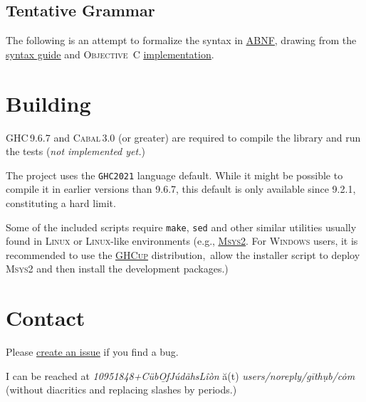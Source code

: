 \documentclass[11pt]{article}
\newcommand{\link}[2]{\underline{\color{darkblue}\href{#1}{#2}}}
\begin{document}
  \subsection*{Tentative Grammar}
    The following is an attempt to formalize the syntax in
    \link{https://datatracker.ietf.org/doc/html/rfc5234}{\textsc{ABNF}},
    drawing from the \link{https://fountain.io/syntax/}{syntax guide} and
    \textsc{Objective~C}
    \link{https://github.com/nyousefi/Fountain}{implementation}.

    

\section*{Building}
\textsc{GHC}\,9.6.7 and \textsc{Cabal}\,3.0 (or greater) are required to
compile the library and run the tests ({\em not implemented yet.})

The project uses the \texttt{GHC2021} language default. While it might
be possible to compile it in earlier versions than 9.6.7, this default
is only available since 9.2.1, constituting a hard limit.

Some of the included scripts require \texttt{make}, \texttt{sed} and
other similar utilities usually found in \textsc{Linux} or
\textsc{Linux}-like environments (e.g.,
\link{https://www.msys2.org/}{\textsc{Msys2}}\@. For \textsc{Windows}
users, it is recommended to use the
\link{https://www.haskell.org/ghcup/}{\textsc{GHCup}} distribution,\
allow the installer script to deploy \textsc{Msys2} and then install
the development packages.)

\section*{Contact}
Please
\link{https://github.com/CubOfJudahsLion/fountain-parser/issues}{create an issue}
if you find a bug.

I can be reached at
\textrm{\emph{10951848+C\"{u}b\b{O}fJ\'{u}d\~{a}hsL\^{i}\`{o}n} \u{a}(t)
\emph{users/noreply/g\={i}th\d{u}b/c\.{o}m}} (without diacritics and
replacing slashes by periods.)
\end{document}
